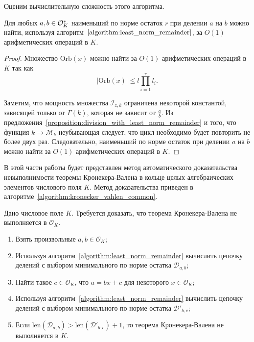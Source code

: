 \documentclass[_00_dissertation.tex]{subfiles}
\begin{document}
Оценим вычислительную сложность этого алгоритма.

\begin{proposition}
    Для любых $a, b \in \mathcal{O}_K^{*}$ наименьший по норме остаток $r$ при делении $a$ на $b$ можно найти, используя алгоритм~$\ref{algorithm:least_norm_remainder}$, за $O(1)$ арифметических операций в $K$.
\end{proposition}
\begin{proof}
    Множество $\textrm{Orb}(x)$ можно найти за $O(1)$ арифметических операций в $K$ так как
    \begin{equation*}
        |\textrm{Orb}(x)| \le l\prod\limits_{i=1}^r l_i.
    \end{equation*}

    Заметим, что мощность множества $\mathcal{I}_{z, k}$ ограничена некоторой константой, зависящей только от $\Gamma(k)$, которая не зависит от $\frac{a}{b}$.
    Из предложения~\ref{proposition:division_with_least_norm_remainder} и того, что функция $k \to \mathcal{M}_k$ неубывающая следует, что цикл необходимо будет повторить не более двух раз.
    Следовательно, наименьший по норме остаток при делении $a$ на $b$ можно найти за $O(1)$ арифметических операций в $K$.
\end{proof}


В этой части работы будет представлен метод автоматического доказательства невыполнимости теоремы Кронекера-Валена в кольце целых алгебраических элементов числового поля $K$.
Метод доказательства приведен в алгоритме~\ref{algorithm:kronecker_vahlen_common}.

\begin{algorithm}\label{algorithm:kronecker_vahlen_common}
    Дано числовое поле $K$.
    Требуется доказать, что теорема Кронекера-Валена не выполняется в $\mathcal{O}_K$.
    
    \begin{enumerate}
        \item Взять произвольные $a, b \in \mathcal{O}_K$;

        \item Используя алгоритм~\ref{algorithm:least_norm_remainder} вычислить цепочку делений с выбором минимального по норме остатка $\mathcal{D}_{a, b}$;

        \item Найти такое $c \in \mathcal{O}_K$, что $a = bx + c$ для некоторого $x \in \mathcal{O}_K$;

        \item Используя алгоритм~\ref{algorithm:least_norm_remainder} вычислить цепочку делений с выбором минимального по норме остатка $\mathcal{D}'_{b,c}$;

        \item Если $\textrm{len}(\mathcal{D}_{a, b}) > \textrm{len}(\mathcal{D}'_{b, c}) + 1$, то теорема Кронекера-Валена не выполняется в $K$.
    \end{enumerate}
\end{algorithm}
\end{document}
